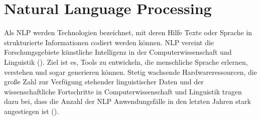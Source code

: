 \section{Natural Language Processing}

Als \ac{NLP} werden Technologien bezeichnet, mit deren Hilfe Texte oder Sprache in strukturierte Informationen codiert werden können. \ac{NLP} vereint die Forschungsgebiete künstliche Intelligenz in der Computerwissenschaft und Linguistik (\cite[vgl.][1]{ITWISSEN}). Ziel ist es, Tools zu entwickeln, die menschliche Sprache erlernen, verstehen und sogar generieren können. Stetig wachsende Hardwareressourcen, die große Zahl zur Verfügung stehender linguistischer Daten und der wissenschaftliche Fortschritte in Computerwissenschaft und Linguistik tragen dazu bei, dass die Anzahl der \ac{NLP} Anwendungsfälle in den letzten Jahren stark angestiegen ist (\cite[vgl.][1]{HIRSCHBERG}).\par


